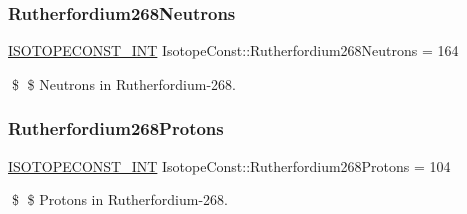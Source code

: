 \subsubsection{\texorpdfstring{Rutherfordium268\+Neutrons}{Rutherfordium268Neutrons}}
{\footnotesize\ttfamily \mbox{\hyperlink{group___isotope_const-_macros_ga5f18360b3e99483a35c32d789e62621c}{I\+S\+O\+T\+O\+P\+E\+C\+O\+N\+S\+T\+\_\+\+I\+NT}} Isotope\+Const\+::\+Rutherfordium268\+Neutrons = 164}

\$ \$ Neutrons in Rutherfordium-\/268. \mbox{\label{group___isotope_const-_rutherfordium-_rf268_ga9537b88927aee7d21b39dadd3f8a1919}} 
\subsubsection{\texorpdfstring{Rutherfordium268\+Protons}{Rutherfordium268Protons}}
{\footnotesize\ttfamily \mbox{\hyperlink{group___isotope_const-_macros_ga5f18360b3e99483a35c32d789e62621c}{I\+S\+O\+T\+O\+P\+E\+C\+O\+N\+S\+T\+\_\+\+I\+NT}} Isotope\+Const\+::\+Rutherfordium268\+Protons = 104}

\$ \$ Protons in Rutherfordium-\/268. 